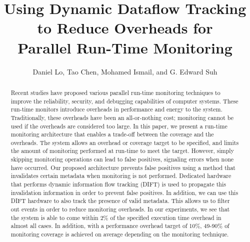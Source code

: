 \title{
Using Dynamic Dataflow Tracking to Reduce Overheads for \\ Parallel
Run-Time Monitoring
}

{\author{Daniel Lo, Tao Chen, Mohamed Ismail, and G. Edward Suh}}

\date{}
\maketitle

\thispagestyle{empty}

\begin{abstract}

Recent studies have proposed various parallel run-time monitoring techniques to
improve the reliability, security, and debugging capabilities of
computer systems. These run-time monitors introduce overheads in performance
and energy to the system. Traditionally, these overheads have been an
all-or-nothing cost; monitoring cannot be used if the overheads are considered too large.
In this paper, we present a run-time monitoring architecture that
enables a trade-off between the coverage and the overheads.
The system allows an overhead or coverage target to be specified,
and limits the amount of monitoring performed at run-time to meet the target. 
However, simply skipping monitoring operations can lead to false
positives, signaling errors when none have occurred. Our proposed architecture
prevents false positives using a method that invalidates certain metadata
when monitoring is not performed. Dedicated hardware that performs dynamic
information flow tracking (DIFT) is used to propagate this invalidation
information in order to prevent false positives. In addition, we can use this
DIFT hardware to also track the presence of valid metadata. This allows us to
filter out events in order to reduce monitoring overheads.
In our experiments, we see that the system is able to come
within 2\% of the specified execution time overhead in almost all cases.  In addition, with a
performance overhead target of 10\%, 49-90\% of monitoring coverage is achieved
on average depending on the monitoring technique.

\end{abstract}
